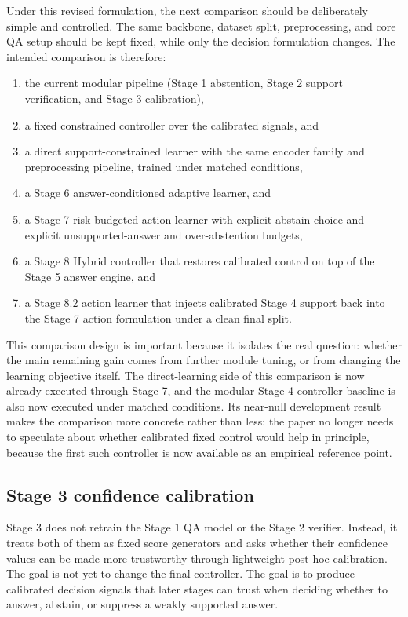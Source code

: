 Under this revised formulation, the next comparison should be deliberately
simple and controlled.
The same backbone, dataset split, preprocessing, and core QA setup should be
kept fixed, while only the decision formulation changes.
The intended comparison is therefore:
\begin{enumerate}[leftmargin=1.25em]
  \item the current modular pipeline
  (Stage 1 abstention, Stage 2 support verification, and Stage 3 calibration),
  \item a fixed constrained controller over the calibrated signals, and
  \item a direct support-constrained learner with the same encoder family and
  preprocessing pipeline, trained under matched conditions,
  \item a Stage 6 answer-conditioned adaptive learner, and
  \item a Stage 7 risk-budgeted action learner with explicit abstain choice
  and explicit unsupported-answer and over-abstention budgets,
  \item a Stage 8 Hybrid controller that restores calibrated control on top of
  the Stage 5 answer engine, and
  \item a Stage 8.2 action learner that injects calibrated Stage 4 support
  back into the Stage 7 action formulation under a clean final split.
\end{enumerate}
This comparison design is important because it isolates the real question:
whether the main remaining gain comes from further module tuning, or from
changing the learning objective itself.
The direct-learning side of this comparison is now already executed through
Stage 7, and the modular Stage 4 controller baseline is also now executed under
matched conditions.
Its near-null development result makes the comparison more concrete rather than
less:
the paper no longer needs to speculate about whether calibrated fixed control
would help in principle, because the first such controller is now available as
an empirical reference point.

\subsection{Stage 3 confidence calibration}

Stage 3 does not retrain the Stage 1 QA model or the Stage 2 verifier.
Instead, it treats both of them as fixed score generators and asks whether
their confidence values can be made more trustworthy through lightweight
post-hoc calibration.
The goal is not yet to change the final controller.
The goal is to produce calibrated decision signals that later stages can trust
when deciding whether to answer, abstain, or suppress a weakly supported
answer.

